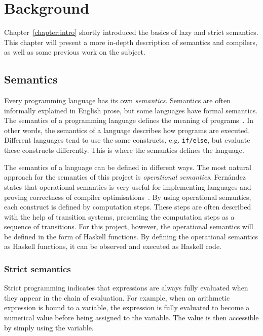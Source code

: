 \chapter{Background}
Chapter~\ref{chapter:intro} shortly introduced the basics of lazy and strict
semantics. This chapter will present a more in-depth description of semantics
and compilers, as well as some previous work on the subject.

\section{Semantics}
Every programming language has its own \textit{semantics}. Semantics are often
informally explained in English prose, but some languages have formal semantics.
The semantics of a programming language defines
the meaning of programs~\cite{Fernand:PLangOpSem}.
In other words, the semantics of a language describes how programs are executed.
Different languages tend to use the same constructs, e.g. \texttt{if/else}, but
evaluate these constructs differently. This is where the semantics defines the
language.

The semantics of a language can be defined in different ways. The most
natural approach for the semantics of this project is
\textit{operational semantics}. Fernández states that operational semantics
is very useful for implementing languages and proving correctness of compiler
optimisations~\cite{Fernand:PLangOpSem}. By using operational
semantics, each construct is defined by computation steps. These steps are
often described with the help of transition systems, presenting the computation
steps as a sequence of transitions. For this project, however,
the operational semantics will be defined in the form of Haskell functions.
By defining the operational semantics as Haskell functions, it can be observed
and executed as Haskell code.

\subsection{Strict semantics}
Strict programming indicates that expressions are always fully evaluated when
they appear in the chain of evaluation. For example, when an arithmetic expression
is bound to a variable, the expression is fully evaluated to become a numerical
value before being assigned to the variable. The value is then accessible
by simply using the variable.

